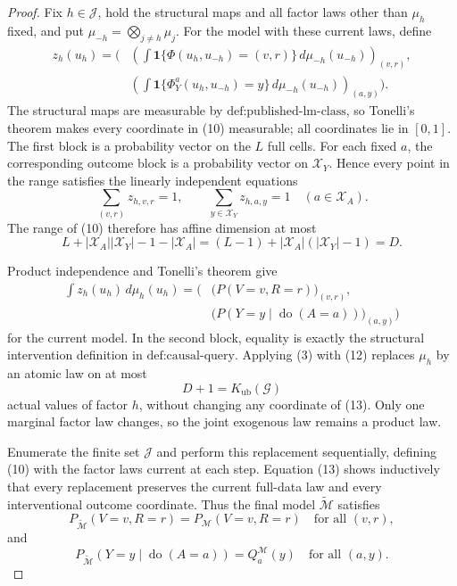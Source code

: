 \documentclass{article}
\begin{document}
\begin{proof}
Fix \(h\in\mathcal J\), hold the structural maps and all factor laws other than \(\mu_h\) fixed, and put \(\mu_{-h}=\bigotimes_{j\neq h}\mu_j\). For the model with these current laws, define
\[
\begin{aligned}
z_h(u_h)=\Bigg(&
\left(
\int\mathbf 1\{\Phi(u_h,u_{-h})=(v,r)\}\,d\mu_{-h}(u_{-h})
\right)_{(v,r)},\\
&\left(
\int\mathbf 1\{\Phi_Y^a(u_h,u_{-h})=y\}\,d\mu_{-h}(u_{-h})
\right)_{(a,y)}
\Bigg).
\end{aligned}
\tag{10}
\]
The structural maps are measurable by \(\text{def:published-lm-class}\), so Tonelli's theorem makes every coordinate in (10) measurable; all coordinates lie in \([0,1]\). The first block is a probability vector on the \(L\) full cells. For each fixed \(a\), the corresponding outcome block is a probability vector on \(\mathcal X_Y\). Hence every point in the range satisfies the linearly independent equations
\[
\sum_{(v,r)}z_{h,v,r}=1,
\qquad
\sum_{y\in\mathcal X_Y}z_{h,a,y}=1
\quad(a\in\mathcal X_A).
\tag{11}
\]
The range of (10) therefore has affine dimension at most
\[
L+|\mathcal X_A||\mathcal X_Y|-1-|\mathcal X_A|
=(L-1)+|\mathcal X_A|(|\mathcal X_Y|-1)=D.
\tag{12}
\]

Product independence and Tonelli's theorem give
\[
\begin{aligned}
\int z_h(u_h)\,d\mu_h(u_h)
=\Big(&\bigl(P(V=v,R=r)\bigr)_{(v,r)},\\
&\bigl(P(Y=y\mid\operatorname{do}(A=a))\bigr)_{(a,y)}\Big)
\end{aligned}
\tag{13}
\]
for the current model. In the second block, equality is exactly the structural intervention definition in \(\text{def:causal-query}\). Applying (3) with (12) replaces \(\mu_h\) by an atomic law on at most
\[
D+1=K_{\mathrm{ub}}(\mathcal G)
\tag{14}
\]
actual values of factor \(h\), without changing any coordinate of (13). Only one marginal factor law changes, so the joint exogenous law remains a product law.

Enumerate the finite set \(\mathcal J\) and perform this replacement sequentially, defining (10) with the factor laws current at each step. Equation (13) shows inductively that every replacement preserves the current full-data law and every interventional outcome coordinate. Thus the final model \(\widetilde{\mathcal M}\) satisfies
\[
P_{\widetilde{\mathcal M}}(V=v,R=r)=P_{\mathcal M}(V=v,R=r)
\quad\text{for all }(v,r),
\tag{15}
\]
and
\[
P_{\widetilde{\mathcal M}}(Y=y\mid\operatorname{do}(A=a))
=Q_a^{\mathcal M}(y)
\quad\text{for all }(a,y).
\tag{16}
\]


\end{proof}
\end{document}
